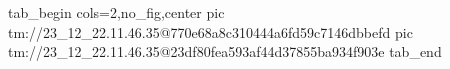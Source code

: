  
 
 
 
 

\qqSecOrig


\ifcmt
  tab_begin cols=2,no_fig,center
    pic tm://23_12_22.11.46.35@770e68a8c310444a6fd59c7146dbbefd
    pic tm://23_12_22.11.46.35@23df80fea593af44d37855ba934f903e
  tab_end
\fi

